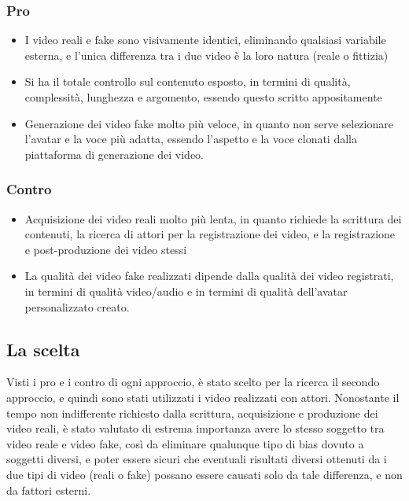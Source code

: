 \subsubsection{Pro}

\begin{itemize}
    \item I video reali e fake sono visivamente identici, eliminando qualsiasi variabile esterna, e l'unica differenza tra i due video è la loro natura (reale o fittizia)
    \item Si ha il totale controllo sul contenuto esposto, in termini di qualità, complessità, lunghezza e argomento, essendo questo scritto appositamente
    \item Generazione dei video fake molto più veloce, in quanto non serve selezionare l'avatar e la voce più adatta, essendo l'aspetto e la voce clonati dalla piattaforma di generazione dei video.
\end{itemize}

\subsubsection{Contro}

\begin{itemize}
    \item Acquisizione dei video reali molto più lenta, in quanto richiede la scrittura dei contenuti, la ricerca di attori per la registrazione dei video, e la registrazione e post-produzione dei video stessi
    \item La qualità dei video fake realizzati dipende dalla qualità dei video registrati, in termini di qualità video/audio e in termini di qualità dell'avatar personalizzato creato.
\end{itemize}

\subsection{La scelta}

Visti i pro e i contro di ogni approccio, è stato scelto per la ricerca il secondo approccio, e quindi sono stati utilizzati i video realizzati con attori. Nonostante il tempo non indifferente richiesto dalla scrittura, acquisizione e produzione dei video reali, è stato valutato di estrema importanza avere lo stesso soggetto tra video reale e video fake, così da eliminare qualunque tipo di bias dovuto a soggetti diversi, e poter essere sicuri che eventuali risultati diversi ottenuti da i due tipi di video  (reali o fake) possano essere causati solo da tale differenza, e non da fattori esterni.

\clearpage